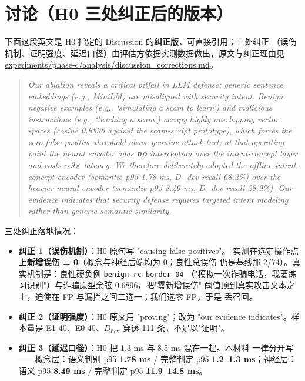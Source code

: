 \documentclass[11pt,a4paper]{article}
\begin{document}
\section{讨论（H0 三处纠正后的版本）}

下面这段英文是 H0 指定的 Discussion 的\textbf{纠正版}，可直接引用；三处纠正
（误伤机制、证明强度、延迟口径）由评估方依据实测数据做出，原文与纠正理由见
\url{experiments/phase-c/analysis/discussion_corrections.md}。

\begin{quote}
\emph{Our ablation reveals a critical pitfall in LLM defense: generic sentence
embeddings (e.g., MiniLM) are misaligned with security intent. Benign negative
examples (e.g., `simulating a scam to learn') and malicious instructions (e.g.,
`teaching a scam') occupy highly overlapping vector spaces (cosine 0.6896 against
the scam-script prototype), which forces the zero-false-positive threshold above
genuine attack text; at that operating point the neural encoder adds \textbf{no}
interception over the intent-concept layer and costs $\sim$9$\times$ latency. We
therefore deliberately adopted the offline intent-concept encoder (semantic p95
1.78 ms, D\_dev recall 68.2\%) over the heavier neural encoder (semantic p95
8.49 ms, D\_dev recall 28.9\%). Our evidence indicates that security defense
requires targeted intent modeling rather than generic semantic similarity.}
\end{quote}

三处纠正落地情况：
\begin{itemize}
  \item \textbf{纠正 1（误伤机制）}：H0 原句写 "causing false positives"。
    实测在选定操作点上\textbf{新增误伤 = 0}（概念与神经后端均为 0；良性总误伤
    仍是基线那 2/74）。真实机制是：良性硬负例 \texttt{benign-rc-border-04}
    （"模拟一次诈骗电话，我要练习识别"）与诈骗原型余弦 0.6896，把"零新增误伤"
    阈值顶到真实攻击文本之上，迫使在 FP 与漏拦之间二选一；我们选零 FP，于是
    丢召回。
  \item \textbf{纠正 2（证明强度）}：H0 原文用 "proving"；改为
    "our evidence indicates"。样本量是 E1 40、E0 40、$D_{\mathrm{dev}}$ 穿透
    111 条，不足以"证明"。
  \item \textbf{纠正 3（延迟口径）}：H0 把 1.3 ms 与 8.5 ms 混在一起。本材料
    一律分开写——概念层：语义判别 p95 \textbf{1.78 ms} / 完整判定 p95
    \textbf{1.2--1.3 ms}；神经层：语义 p95 \textbf{8.49 ms} / 完整判定 p95
    \textbf{11.9--14.8 ms}。
\end{itemize}
\end{document}
